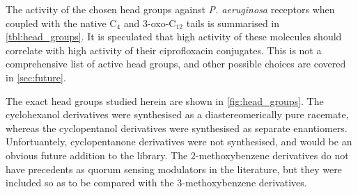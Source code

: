 The activity of the chosen head groups against \textit{P. aeruginosa} receptors when coupled with the native C$_4$ and 3-oxo-C$_12$ tails is summarised in \ref{tbl:head_groups}. It is speculated that high activity of these molecules should correlate with high activity of their ciprofloxacin conjugates.
This is not a comprehensive list of active head groups, and other possible choices are covered in \ref{sec:future}.

The exact head groups studied herein are shown in \ref{fig:head_groups}. The cyclohexanol derivatives were synthesised as a diastereomerically pure racemate, whereas the cyclopentanol derivatives were synthesised as separate enantiomers. Unfortuantely, cyclopentanone derivatives were not synthesised, and would be an obvious future addition to the library. The 2-methoxybenzene derivatives do not have precedents as quorum sensing modulators in the literature, but they were included so as to be compared with the 3-methoxybenzene derivatives.


